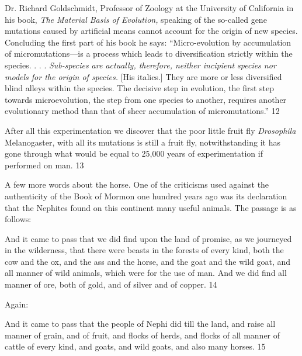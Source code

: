 Dr. Richard Goldschmidt, Professor of Zoology at the University of California in his book,
\textit{The Material Basis of Evolution,} speaking of the so-called gene mutations caused by artificial
means cannot account for the origin of new species. Concluding the first part of his book he
says: ``Micro-evolution by accumulation of micromutations—is a process which leads to
diversification strictly within the species. . . . \textit{Sub-species are actually, therefore, neither
incipient species nor models for the origin of species.} [His italics.] They are more or less
diversified blind alleys within the species. The decisive step in evolution, the first step
towards microevolution, the step from one species to another, requires another evolutionary
method than that of sheer accumulation of micromutations.'' 12

After all this experimentation we discover that the poor little fruit fly \textit{Drosophila}
Melanogaster, with all its mutations is still a fruit fly, notwithstanding it has gone through
what would be equal to 25,000 years of experimentation if performed on man. 13

A few more words about the horse. One of the criticisms used against the authenticity of the
Book of Mormon one hundred years ago was its declaration that the Nephites found on this
continent many useful animals. The passage is as follows:

And it came to pass that we did find upon the land of promise, as we journeyed in the
wilderness, that there were beasts in the forests of every kind, both the cow and the ox, and
the ass and the horse, and the goat and the wild goat, and all manner of wild animals, which
were for the use of man. And we did find all manner of ore, both of gold, and of silver and of
copper. 14

Again:

And it came to pass that the people of Nephi did till the land, and raise all manner of grain,
and of fruit, and flocks of herds, and flocks of all manner of cattle of every kind, and goats,
and wild goats, and also many horses. 15

